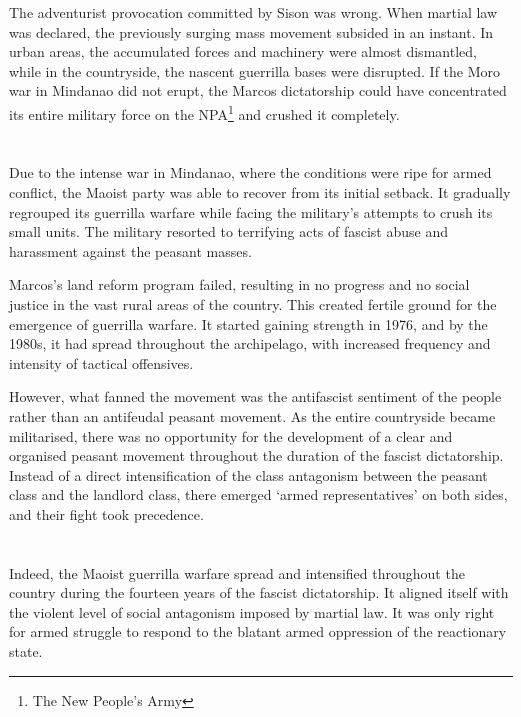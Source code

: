 The adventurist provocation committed by Sison was wrong. 
When martial law was declared, 
the previously surging mass movement subsided in an instant. 
In urban areas, 
the accumulated forces and machinery were almost dismantled, 
while in the countryside, 
the nascent guerrilla bases were disrupted. 
If the Moro war in Mindanao did not erupt, 
the Marcos dictatorship could have concentrated 
its entire military force on the NPA\footnote{The New People's Army} 
and crushed it completely.


\section{}
Due to the intense war in Mindanao, 
where the conditions were ripe for armed conflict, 
the Maoist party was able to recover from its initial setback. 
It gradually regrouped its guerrilla warfare 
while facing the military's attempts to crush its small units.
The military resorted to terrifying acts of fascist abuse and harassment 
against the peasant masses.

Marcos's land reform program failed, 
resulting in no progress and no social justice 
in the vast rural areas of the country. 
This created fertile ground for the emergence of guerrilla warfare. 
It started gaining strength in 1976, and by the 1980s, 
it had spread throughout the archipelago, 
with increased frequency and intensity of tactical offensives.

However, 
what fanned the movement was the antifascist sentiment of the people 
rather than an antifeudal peasant movement. 
As the entire countryside became militarised, 
there was no opportunity 
for the development of a clear and organised peasant movement 
throughout the duration of the fascist dictatorship. 
Instead of a direct intensification of the class antagonism 
between the peasant class and the landlord class, 
there emerged `armed representatives' on both sides, 
and their fight took precedence.


\section{}
Indeed, 
the Maoist guerrilla warfare spread and intensified 
throughout the country 
during the fourteen years of the fascist dictatorship. 
It aligned itself 
with the violent level of social antagonism 
imposed by martial law. 
It was only right for armed struggle 
to respond to the blatant armed oppression 
of the reactionary state.

